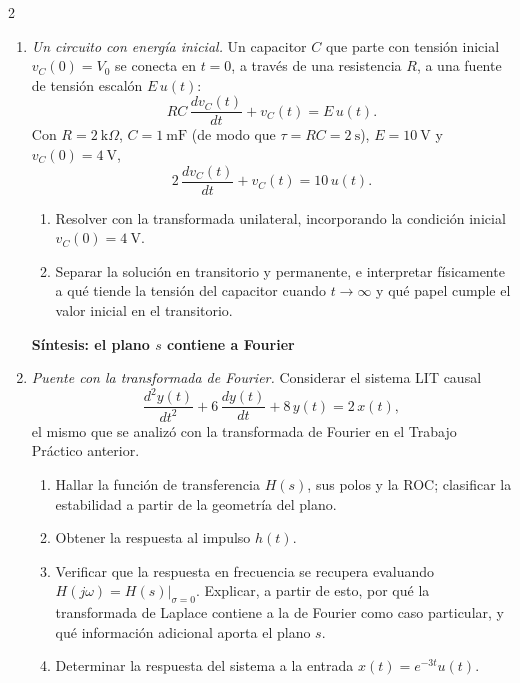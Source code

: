 \documentclass[10pt,a4paper]{article}
\begin{document}
\begin{multicols}{2}
\begin{enumerate}
			\item \emph{Un circuito con energía inicial.} Un capacitor $C$ que parte con tensión inicial $v_C(0) = V_0$ se conecta en $t = 0$, a través de una resistencia $R$, a una fuente de tensión escalón $E\,u(t)$:
			\[
				RC\,\frac{dv_C(t)}{dt} + v_C(t) = E\,u(t).
			\]
			Con $R = 2\ \text{k}\Omega$, $C = 1\ \text{mF}$ (de modo que $\tau = RC = 2\ \text{s}$), $E = 10\ \text{V}$ y $v_C(0) = 4\ \text{V}$,
			\[
				2\,\frac{dv_C(t)}{dt} + v_C(t) = 10\,u(t).
			\]
			\begin{enumerate}
				\item Resolver con la transformada unilateral, incorporando la condición inicial $v_C(0) = 4\ \text{V}$.
				\item Separar la solución en transitorio y permanente, e interpretar físicamente a qué tiende la tensión del capacitor cuando $t \to \infty$ y qué papel cumple el valor inicial en el transitorio.
			\end{enumerate}

			\textbf{Síntesis: el plano $s$ contiene a Fourier}
			\item \emph{Puente con la transformada de Fourier.} Considerar el sistema LIT causal
			\[
				\frac{d^2 y(t)}{dt^2} + 6\,\frac{d y(t)}{dt} + 8\,y(t) = 2\,x(t),
			\]
			el mismo que se analizó con la transformada de Fourier en el Trabajo Práctico anterior.
			\begin{enumerate}
				\item Hallar la función de transferencia $H(s)$, sus polos y la ROC; clasificar la estabilidad a partir de la geometría del plano.
				\item Obtener la respuesta al impulso $h(t)$.
				\item Verificar que la respuesta en frecuencia se recupera evaluando $H(j\omega) = \left. H(s)\right|_{\sigma = 0}$. Explicar, a partir de esto, por qué la transformada de Laplace contiene a la de Fourier como caso particular, y qué información adicional aporta el plano $s$.
				\item Determinar la respuesta del sistema a la entrada $x(t) = e^{-3t}u(t)$.
			\end{enumerate}


\end{enumerate}
\end{multicols}
\end{document}
